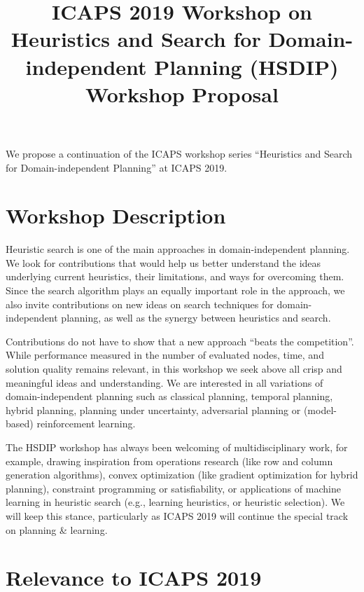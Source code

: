 \documentclass[10pt]{article}
\begin{document}
\title{ICAPS 2019 Workshop on \\ Heuristics and Search for Domain-independent
Planning (HSDIP)\\ \vspace*{0.7cm} Workshop Proposal
}
\date{}

\author{}

\maketitle


We propose a continuation of the ICAPS workshop series ``Heuristics
and Search for Domain-independent Planning'' at ICAPS 2019.

\section*{Workshop Description}
Heuristic search is one of the main approaches in domain-independent
planning.  We look for contributions that would help us better
understand the ideas underlying current heuristics, their limitations,
and ways for overcoming them.
%
Since the search algorithm plays an equally important role in the
approach, we also invite contributions on new ideas on search
techniques for domain-independent planning, as well as the synergy
between heuristics and search.

Contributions do not have to show that a new approach ``beats the competition''.
While performance measured in the number of evaluated nodes, time, and solution
quality remains relevant, in this workshop we seek above all crisp and
meaningful ideas and understanding.
%
We are interested in all variations of domain-independent planning
such as classical planning, temporal planning, hybrid planning, planning under
uncertainty, adversarial planning or (model-based) reinforcement learning.

The HSDIP workshop has always been welcoming of multidisciplinary work,
for example, drawing inspiration from operations research (like row and
column generation algorithms), convex optimization (like gradient
optimization for hybrid planning), constraint programming or
satisfiability, or applications of machine learning in heuristic search
(e.g., learning heuristics, or heuristic selection). We will keep this
stance, particularly as ICAPS 2019 will continue the special track on
planning \& learning.


\section*{Relevance to ICAPS 2019}
\end{document}

